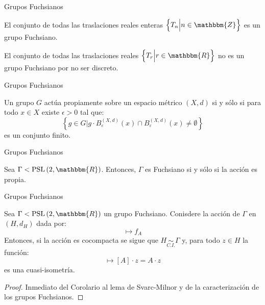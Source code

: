 \documentclass[xcolor=dvipsnames]{beamer}
\theoremstyle{largebreak}
\newcommand{\bbm}[1]{\ensuremath{\mathbbm{#1}}}
\newcommand{\qisom}{\ensuremath{\underset{C.I.}{\sim}}}
\newcommand{\PSL}[1]{\ensuremath{\textup{PSL}\left(#1\right)}}
\begin{document}
\begin{frame}{Grupos Fuchsianos}
    \begin{exa}
        El conjunto de todas las traslaciones reales enteras $\left\{T_n\Big|n\in\bbm{Z} \right\}$ es un grupo Fuchsiano.
    \end{exa}

    \begin{exa}
        El conjunto de todas las traslaciones reales $\left\{T_r\Big|r\in\bbm{R} \right\}$ no es un grupo Fuchsiano por no ser discreto.
    \end{exa}
\end{frame}

\begin{frame}{Grupos Fuchsianos}
    \begin{theor}
        Un grupo $G$ actúa propiamente sobre un espacio métrico $(X,d)$ si y sólo si para todo $x\in X$ existe $\epsilon>0$ tal que:
        \begin{equation*}
            \left\{g\in G\Big|g\cdot B_\varepsilon^{(X,d)}(x)\cap B_\varepsilon^{(X,d)}(x)\neq\emptyset \right\}
        \end{equation*}
        es un conjunto finito.
    \end{theor}
\end{frame}

\begin{frame}{Grupos Fuchsianos}
    \begin{theor}
        Sea $\Gamma<\PSL{2,\bbm{R}}$. Entonces, $\Gamma$ es Fuchsiano si y sólo si la acción es propia.
    \end{theor}
\end{frame}

\begin{frame}{Grupos Fuchsianos}
    \begin{theor}
        Sea $\Gamma<\PSL{2,\bbm{R}}$ un grupo Fuchsiano. Conisdere la acción de $\Gamma$ en $(H,d_H)$ dada por:
        \begin{equation*}
            [A]\mapsto f_A
        \end{equation*}
        Entonces, si la acción es cocompacta se sigue que $H\qisom \Gamma$ y, para todo $z\in H$ la función:
        \begin{equation*}
            [A]\mapsto [A]\cdot z=A\cdot z
        \end{equation*}
        es una cuasi-isometría.
    \end{theor}

    \pause

    \begin{proof}
        Inmediato del Corolario al lema de Svarc-Milnor y de la caracterización de los grupos Fuchsianos.
    \end{proof}
\end{frame}
\end{document}
